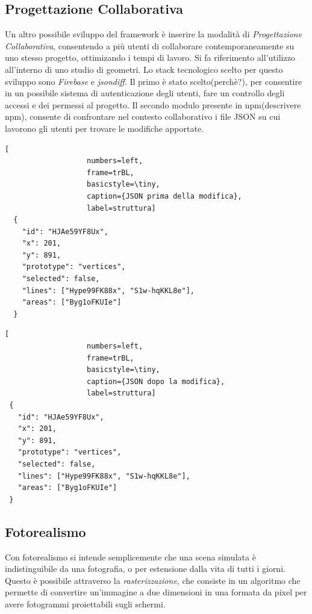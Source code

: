 \subsection{Progettazione Collaborativa}
\label{sec:conclusions_section_2_sub_2}
Un altro possibile sviluppo del framework è inserire la modalità di \emph{Progettazione Collaborativa}, consentendo a più utenti
di collaborare contemporaneamente su uno stesso progetto, ottimizando i tempi di lavoro. Si fa riferimento
all'utilizzo all'interno di uno studio di geometri. Lo stack tecnologico scelto per questo sviluppo sono
\emph{Firebase} e \emph{jsondiff}. Il primo è stato scelto(perchè?), per consentire in un possibile sistema di autenticazione degli utenti,
fare un controllo degli accessi e dei permessi al progetto.
Il secondo modulo presente in npm(descrivere npm), consente di confrontare nel contesto collaborativo i file JSON su cui lavorono
gli utenti per trovare le modifiche apportate.\\

\noindent
\begin{minipage}{.45\textwidth}
\begin{lstlisting}[
                   numbers=left,
                   frame=trBL,
                   basicstyle=\tiny,
                   caption={JSON prima della modifica},
                   label=struttura]
  {
    "id": "HJAe59YF8Ux",
    "x": 201,
    "y": 891,
    "prototype": "vertices",
    "selected": false,
    "lines": ["Hype99FK88x", "S1w-hqKKL8e"],
    "areas": ["Byg1oFKUIe"]
  }
\end{lstlisting}
\end{minipage}\hfill
\begin{minipage}{.45\textwidth}
\begin{lstlisting}[
                   numbers=left,
                   frame=trBL,
                   basicstyle=\tiny,
                   caption={JSON dopo la modifica},
                   label=struttura]
 {
   "id": "HJAe59YF8Ux",
   "x": 201,
   "y": 891,
   "prototype": "vertices",
   "selected": false,
   "lines": ["Hype99FK88x", "S1w-hqKKL8e"],
   "areas": ["Byg1oFKUIe"]
 }
\end{lstlisting}
\end{minipage}

\newpage

\subsection{Fotorealismo}
\label{sec:conclusions_section_2_sub_3}
Con fotorealismo si intende semplicemente che una scena simulata \`e indistinguibile da una fotografia, o per estensione
dalla vita di tutti i giorni. Questo è possibile attraverso la \emph{rasterizzazione}, che consiste in un algoritmo che
permette di convertire un'immagine a due dimensioni in una formata da pixel per avere fotogrammi proiettabili sugli schermi.


